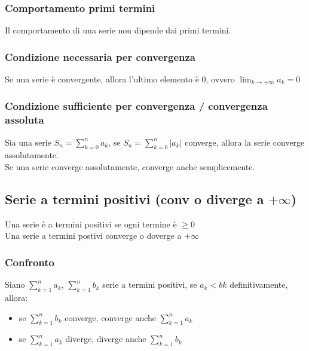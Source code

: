\documentclass[a4paper]{article}
\begin{document}
\subsubsection*{Comportamento primi termini}
Il comportamento di una serie non dipende dai primi termini.

\subsubsection*{Condizione necessaria per convergenza}
Se una serie è convergente, allora l'ultimo elemento è 0, ovvero \(\displaystyle \lim_{k \to +\infty} a_k = 0\)

\subsubsection*{Condizione sufficiente per convergenza / convergenza assoluta}
Sia una serie \(\displaystyle S_n = \sum_{k = 0}^{n} a_k\), se \(\displaystyle S_n = \sum_{k = 0}^{n} \left| a_k \right|\) converge, allora la serie converge assolutamente. \\
Se una serie converge assolutamente, converge anche semplicemente.

\subsection{Serie a termini positivi (conv o diverge a \(+ \infty\))}
Una serie è a termini positivi se ogni termine è \(\geq 0\) \\ 
Una serie a termini postivi converge o doverge a \(+ \infty\)

\subsubsection*{Confronto}
Siano \(\displaystyle \sum_{k = 1}^{n} a_k\), \(\displaystyle \sum_{k = 1}^{n} b_k\) serie a termini positivi, se \(a_k < bk\) definitivamente, allora:
\begin{itemize}
	\item se \( \sum_{k = 1}^{n} b_k\) converge, converge anche \(\sum_{k = 1}^{n} a_k\)
	\item se \(\sum_{k = 1}^{n} a_k\) diverge, diverge anche \(\sum_{k = 1}^{n} b_k\)
\end{itemize}
\end{document}

